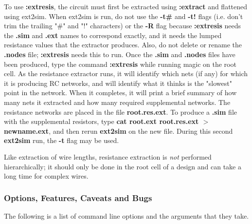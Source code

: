 \documentclass[letterpaper,twoside,12pt]{article}
\begin{document}
To use {\bfseries :extresis}, the circuit must first be extracted using
{\bfseries :extract} and flattened using ext2sim. When ext2sim is run,
do not use the {\bfseries -t\#} and {\bfseries -t!} flags (i.e. don't
trim the trailing "\#" and "!" characters) or the {\bfseries -R} flag
because {\bfseries :extresis} needs the {\bfseries .sim} and {\bfseries .ext}
names to correspond exactly, and it needs the lumped resistance values that
the extractor produces. Also, do not delete or rename the {\bfseries .nodes}
file; {\bfseries :extresis} needs this to run. Once the {\bfseries .sim} and
{\bfseries .nodes} files have been produced, type the command
{\bfseries :extresis} while running magic on the root cell.  As the
resistance extractor runs, it will identify which nets (if any) for
which it is producing RC networks, and will
identify what it thinks is the "slowest" point in the network.  When it
completes, it will print a brief summary of how many nets it extracted and
how many required supplemental networks.  The resistance networks are placed
in the file {\bfseries root.res.ext}.  To produce a {\bfseries .sim} file
with the supplemental
resistors, type {\bfseries cat root.ext root.res.ext $>$newname.ext}, and then rerun
{\bfseries ext2sim} on the new file.  During this second {\bfseries ext2sim} run, the 
{\bfseries -t} flag may be used.

Like extraction of wire lengths, resistance extraction is {\itshape not} performed 
hierarchically; it should only be done in the root cell of a design and
can take a long time for complex wires.

\subsubsection{Options, Features, Caveats and Bugs}

The following is a list of command line options and the arguments that they
take.
\end{document}
